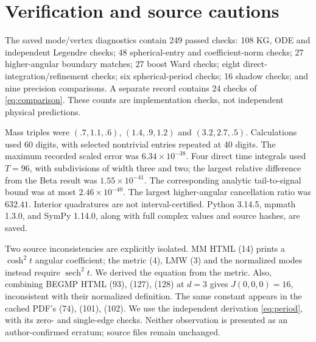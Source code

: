 \documentclass[11pt,a4paper]{article}
\newcommand{\sech}{\operatorname{sech}}
\begin{document}
\newpage
\section{Verification and source cautions}
The saved mode/vertex diagnostics contain 249 passed checks:
108 KG, ODE and independent Legendre checks; 48 spherical-entry
and coefficient-norm checks; 27 higher-angular boundary matches;
27 boost Ward checks; eight direct-integration/refinement checks;
six spherical-period checks; 16 shadow checks; and nine precision
comparisons. A separate record contains 24 checks of
\eqref{eq:comparison}. These counts are implementation checks,
not independent physical predictions.

Mass triples were $(.7,1.1,.6)$, $(1.4,.9,1.2)$ and $(3.2,2.7,.5)$.
Calculations used 60 digits, with selected nontrivial entries
repeated at 40 digits. The maximum recorded scaled error was
$6.34\times10^{-38}$. Four direct time integrals used $T=96$,
with subdivisions of width three and two; the largest relative
difference from the Beta result was $1.55\times10^{-41}$.
The corresponding analytic tail-to-signal bound was at most
$2.46\times10^{-40}$. The largest higher-angular cancellation
ratio was $632.41$. Interior quadratures are not interval-certified.
Python 3.14.5, mpmath 1.3.0, and SymPy 1.14.0, along
with full complex values and source hashes, are saved.

Two source inconsistencies are explicitly isolated.
MM HTML (14) prints a $\cosh^2t$ angular coefficient; the metric
(4), LMW (3) and the normalized modes instead require $\sech^2t$.
We derived the equation from the metric.
Also, combining BEGMP HTML (93), (127), (128) at $d=3$ gives
$J(0,0,0)=16$, inconsistent with their normalized definition.
The same constant appears in the cached PDF's (74), (101), (102).
We use the independent derivation \eqref{eq:period}, with its
zero- and single-edge checks. Neither observation is presented
as an author-confirmed erratum; source files remain unchanged.
\end{document}

